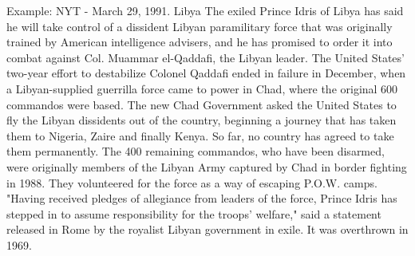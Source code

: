 \documentclass[english]{beamer}
\begin{document}
\begin{frame}
{\normalsize{Example: NYT - March 29, 1991. Libya}}
The exiled Prince
Idris of Libya has said he will take control of a dissident Libyan
paramilitary force that was originally trained by American intelligence
advisers, and he has promised to order it into combat against Col. Muammar
el-Qaddafi, the Libyan leader. The United States' two-year effort to
destabilize Colonel Qaddafi ended in failure in December, when a
Libyan-supplied guerrilla force came to power in Chad, where the original
600 commandos were based. The new Chad Government asked the United States to
fly the Libyan dissidents out of the country, beginning a journey that has
taken them to Nigeria, Zaire and finally Kenya. So far, no country has
agreed to take them permanently. The 400 remaining commandos, who have been
disarmed, were originally members of the Libyan Army captured by Chad in
border fighting in 1988. They volunteered for the force as a way of escaping
P.O.W. camps. "Having received pledges of allegiance from leaders of the
force, Prince Idris has stepped in to assume responsibility for the troops'
welfare," said a statement released in Rome by the royalist Libyan
government in exile. It was overthrown in 1969.
\end{frame}
%
\end{document}
